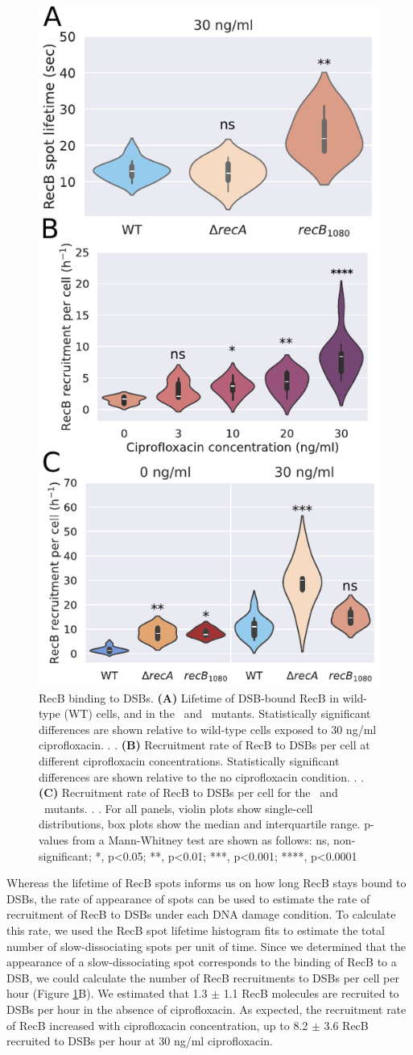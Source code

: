 \begin{figure}[htbp]
    \centering
    \includegraphics[width=.48\textwidth]{Figures/Fig3_RecB_recruitment.pdf}
    \caption{RecB binding to DSBs. \textbf{(A)} Lifetime of DSB-bound RecB in wild-type (WT) cells, and in the \dreca\ and \geneteneighty\ mutants. Statistically significant differences are shown relative to wild-type cells exposed to 30 ng/ml ciprofloxacin. \ncells{}. \nspots{}. \textbf{(B)} Recruitment rate of RecB to DSBs per cell at different ciprofloxacin concentrations. Statistically significant differences are shown relative to the no ciprofloxacin condition. . . \textbf{(C)} Recruitment rate of RecB to DSBs per cell for the \dreca\ and \geneteneighty\ mutants. . . For all panels, violin plots show single-cell distributions, box plots show the median and interquartile range. p-values from a Mann-Whitney test are shown as follows: ns, non-significant; *, p<0.05; **, p<0.01; ***, p<0.001; ****, p<0.0001}
    \label{Fig:recruitment}
\end{figure}

Whereas the lifetime of RecB spots informs us on how long RecB stays bound to DSBs, the rate of appearance of spots can be used to estimate the rate of recruitment of RecB to DSBs under each DNA damage condition. To calculate this rate, we used the RecB spot lifetime histogram fits to estimate the total number of slow-dissociating spots per unit of time. Since we determined that the appearance of a slow-dissociating spot corresponds to the binding of RecB to a DSB, we could calculate the number of RecB recruitments to DSBs per cell per hour (Figure \ref{Fig:recruitment}B). We estimated that 1.3 $\pm$ 1.1 RecB molecules are recruited to DSBs per hour in the absence of ciprofloxacin. As expected, the recruitment rate of RecB increased with ciprofloxacin concentration, up to 8.2 $\pm$ 3.6 RecB recruited to DSBs per hour at 30 ng/ml ciprofloxacin.

